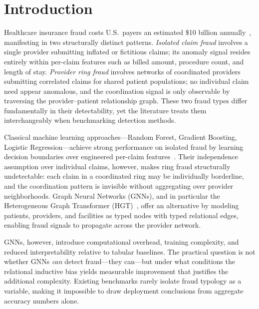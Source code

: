\documentclass[pdflatex,sn-mathphys-num]{sn-jnl}
\theoremstyle{thmstyleone}
\theoremstyle{thmstyletwo}
\theoremstyle{thmstylethree}
\begin{document}

\maketitle

\section{Introduction}\label{sec:intro}

Healthcare insurance fraud costs U.S.\ payers an estimated \$10
billion annually~\cite{nhcaa2023}, manifesting in two structurally
distinct patterns. \emph{Isolated claim fraud} involves a single
provider submitting inflated or fictitious claims; its anomaly signal
resides entirely within per-claim features such as billed amount,
procedure count, and length of stay. \emph{Provider ring fraud}
involves networks of coordinated providers submitting correlated claims
for shared patient populations; no individual claim need appear
anomalous, and the coordination signal is only observable by traversing
the provider--patient relationship graph. These two fraud types differ
fundamentally in their detectability, yet the literature treats them
interchangeably when benchmarking detection methods.

Classical machine learning approaches---Random Forest, Gradient
Boosting, Logistic Regression---achieve strong performance on isolated
fraud by learning decision boundaries over engineered per-claim
features~\cite{bauder2017}. Their independence assumption over
individual claims, however, makes ring fraud structurally
undetectable: each claim in a coordinated ring may be individually
borderline, and the coordination pattern is invisible without
aggregating over provider neighborhoods. Graph Neural Networks (GNNs),
and in particular the Heterogeneous Graph Transformer
(HGT)~\cite{hu2020hgt}, offer an alternative by modeling patients,
providers, and facilities as typed nodes with typed relational edges,
enabling fraud signals to propagate across the provider network.

GNNs, however, introduce computational overhead, training complexity,
and reduced interpretability relative to tabular baselines. The
practical question is not whether GNNs \emph{can} detect fraud---they
can---but under what conditions the relational inductive bias yields
measurable improvement that justifies the additional complexity.
Existing benchmarks rarely isolate fraud typology as a variable,
making it impossible to draw deployment conclusions from aggregate
accuracy numbers alone.
\end{document}
